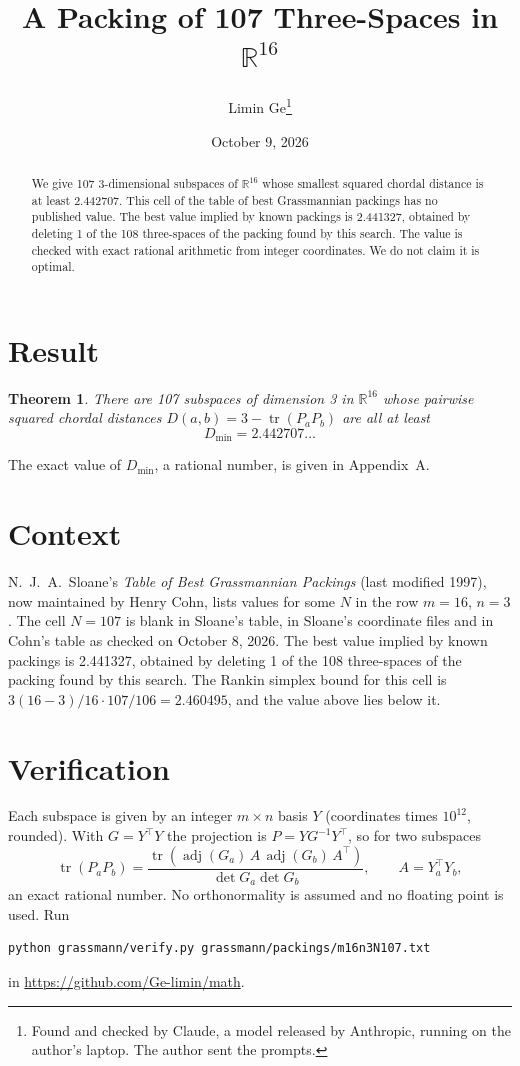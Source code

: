\documentclass[11pt,a4paper]{article}
\title{A Packing of 107 Three-Spaces in $\mathbb{R}^{16}$}
\author{Limin Ge\thanks{Found and checked by Claude, a model released by Anthropic, running on the author's laptop. The author sent the prompts.}}
\date{October 9, 2026}
\newtheorem*{theorem}{Theorem}
\begin{document}
\maketitle
\begin{abstract}
We give 107 3-dimensional subspaces of $\mathbb{R}^{16}$ whose smallest squared chordal distance is at least 2.442707. This cell of the table of best Grassmannian packings has no published value. The best value implied by known packings is 2.441327, obtained by deleting 1 of the 108 three-spaces of the packing found by this search. The value is checked with exact rational arithmetic from integer coordinates. We do not claim it is optimal.
\end{abstract}

\section{Result}
\begin{theorem}
There are 107 subspaces of dimension 3 in $\mathbb{R}^{16}$ whose pairwise squared chordal distances $D(a,b) = 3 - \operatorname{tr}(P_aP_b)$ are all at least
\[ D_{\min} = 2.442707\ldots \]
\end{theorem}
The exact value of $D_{\min}$, a rational number, is given in Appendix~A.


\section{Context}
N.~J.~A.~Sloane's \emph{Table of Best Grassmannian Packings} (last modified 1997), now maintained by Henry Cohn, lists values for some $N$ in the row $m=16$, $n=3$. The cell $N=107$ is blank in Sloane's table, in Sloane's coordinate files and in Cohn's table as checked on October 8, 2026. The best value implied by known packings is 2.441327, obtained by deleting 1 of the 108 three-spaces of the packing found by this search. The Rankin simplex bound for this cell is $3(16-3)/16\cdot 107/106 = 2.460495$, and the value above lies below it.


\section{Verification}
Each subspace is given by an integer $m\times n$ basis $Y$ (coordinates times $10^{12}$, rounded). With $G=Y^\top Y$ the projection is $P=YG^{-1}Y^\top$, so for two subspaces
\[ \operatorname{tr}(P_aP_b)=\frac{\operatorname{tr}(\operatorname{adj}(G_a)\,A\,\operatorname{adj}(G_b)\,A^\top)}{\det G_a\det G_b},\qquad A=Y_a^\top Y_b, \]
an exact rational number. No orthonormality is assumed and no floating point is used. Run
\begin{verbatim}
python grassmann/verify.py grassmann/packings/m16n3N107.txt
\end{verbatim}
in \url{https://github.com/Ge-limin/math}.
\end{document}
